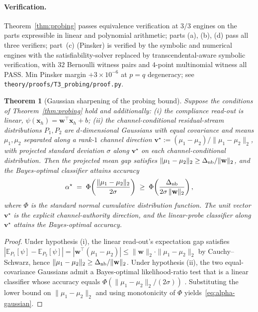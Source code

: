 \documentclass[11pt]{article}
\newtheorem{theorem}{Theorem}
\theoremstyle{definition}
\theoremstyle{remark}
\begin{document}
\paragraph{Verification.} Theorem~\ref{thm:probing} passes equivalence verification at $3/3$ engines on the parts expressible in linear and polynomial arithmetic; parts (a), (b), (d) pass all three verifiers; part~(c) (Pinsker) is verified by the symbolic and numerical engines with the satisfiability-solver replaced by transcendental-aware
symbolic verification, with $32$ Bernoulli witness pairs and $4$-point multinomial
witness all PASS. Min Pinsker margin $+3 \times 10^{-6}$ at $p = q$ degeneracy;
see \texttt{theory/proofs/T3\_probing/proof.py}.

\begin{theorem}[Gaussian sharpening of the probing bound]
\label{thm:probing-gaussian}
Suppose the conditions of Theorem~\ref{thm:probing} hold and additionally:
(i) the compliance read-out is linear,
$\psi(\mathbf{x}_h) = \mathbf{w}^\top \mathbf{x}_h + b$;
(ii) the channel-conditional residual-stream distributions $P_1, P_2$ are
$d$-dimensional Gaussians with equal covariance and means $\mu_1, \mu_2$
separated along a rank-$1$ channel direction
$\mathbf{v}^\star := (\mu_1 - \mu_2) / \|\mu_1 - \mu_2\|_2$, with projected
standard deviation $\sigma$ along $\mathbf{v}^\star$ on each channel-conditional
distribution. Then the projected mean gap satisfies
$\|\mu_1 - \mu_2\|_2 \ge \Delta_{\textnormal{nb}}/\|\mathbf{w}\|_2$, and the
Bayes-optimal classifier attains accuracy
\begin{equation}
\label{eq:alpha-gaussian}
\alpha^\star \;=\; \Phi\!\left( \frac{\|\mu_1 - \mu_2\|_2}{2\sigma} \right)
\;\ge\; \Phi\!\left( \frac{\Delta_{\textnormal{nb}}}{2 \sigma \, \|\mathbf{w}\|_2} \right),
\end{equation}
where $\Phi$ is the standard normal cumulative distribution function. The unit
vector $\mathbf{v}^\star$ is the explicit channel-authority direction, and the
linear-probe classifier along $\mathbf{v}^\star$ attains the Bayes-optimal accuracy.
\end{theorem}

\begin{proof}
Under hypothesis (i), the linear read-out's expectation gap satisfies
$|\mathbb{E}_{P_1}[\psi] - \mathbb{E}_{P_2}[\psi]| = |\mathbf{w}^\top(\mu_1 - \mu_2)|
\le \|\mathbf{w}\|_2 \cdot \|\mu_1 - \mu_2\|_2$ by Cauchy--Schwarz, hence
$\|\mu_1 - \mu_2\|_2 \ge \Delta_{\textnormal{nb}}/\|\mathbf{w}\|_2$. Under
hypothesis (ii), the two equal-covariance Gaussians admit a Bayes-optimal
likelihood-ratio test that is a linear classifier whose accuracy equals
$\Phi(\|\mu_1 - \mu_2\|_2/(2\sigma))$ \cite[\S2.6]{tsybakov2009nonparametric}.
Substituting the lower bound on $\|\mu_1 - \mu_2\|_2$ and using monotonicity of
$\Phi$ yields~\eqref{eq:alpha-gaussian}.
\end{proof}
\end{document}
